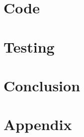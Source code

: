 \documentclass[11pt]{article}
\begin{document}
\section{Code}
    
    
\section{Testing}
    
\section{Conclusion}

\newpage
\section{Appendix}

\begin{multicols}{2}

\end{multicols}


\newpage
\end{document}
